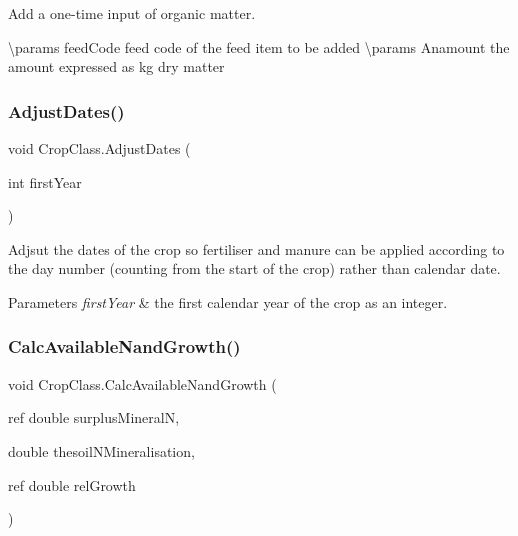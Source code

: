 Add a one-\/time input of organic matter. 

\textbackslash{}params feed\+Code feed code of the feed item to be added \textbackslash{}params Anamount the amount expressed as kg dry matter \mbox{\label{class_crop_class_a78b34023e52dca49077073e7191727b1}} 
\subsubsection{\texorpdfstring{AdjustDates()}{AdjustDates()}}
{\footnotesize\ttfamily void Crop\+Class.\+Adjust\+Dates (\begin{DoxyParamCaption}\item[{int}]{first\+Year }\end{DoxyParamCaption})\hspace{0.3cm}{\ttfamily [inline]}}



Adjsut the dates of the crop so fertiliser and manure can be applied according to the day number (counting from the start of the crop) rather than calendar date. 


\begin{DoxyParams}{Parameters}
{\em first\+Year} & the first calendar year of the crop as an integer. \\
\hline
\end{DoxyParams}
\mbox{\label{class_crop_class_a93cd3a43b010bf87d8719cc1e45b9dd2}} 
\subsubsection{\texorpdfstring{CalcAvailableNandGrowth()}{CalcAvailableNandGrowth()}}
{\footnotesize\ttfamily void Crop\+Class.\+Calc\+Available\+Nand\+Growth (\begin{DoxyParamCaption}\item[{ref double}]{surplus\+MineralN,  }\item[{double}]{thesoil\+N\+Mineralisation,  }\item[{ref double}]{rel\+Growth }\end{DoxyParamCaption})\hspace{0.3cm}{\ttfamily [inline]}}



